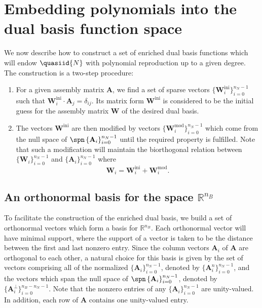 \section{Embedding polynomials into the dual basis function space}\label{sec:algorithm}

We now describe how to construct a set of enriched dual basis functions which will endow $\quasiid{N}$ with polynomial reproduction up to a given degree. The construction is a two-step procedure:
\begin{enumerate}
\item For a given assembly matrix $\mathbf{A}$, we find a set of sparse vectors $\{\mathbf{W}^\text{ini}_i\}_{i=0}^{n_N-1}$ such that $\mathbf{W}^\text{ini}_i\cdot\mathbf{A}_j=\delta_{ij}$. Its matrix form $\mathbf{W}^\text{ini}$ is considered to be the initial guess for the assembly matrix $\mathbf{W}$ of the desired dual basis.
  \item The vectors $\mathbf{W}^\text{ini}$ are then modified by vectors $\{\mathbf{W}^\text{mod}_i\}_{i=0}^{n_N-1}$ which come from the null space of $\spn\left\{\mathbf{A}_i\right\}_{i=0}^{n_N-1}$ until the required property is fulfilled. Note that such a modification will maintain the biorthogonal relation between $\{\mathbf{W}_i\}_{i=0}^{n_N-1}$ and $\{\mathbf{A}_i\}_{i=0}^{n_N-1}$ where
\begin{equation}
	\mathbf{W}_i=\mathbf{W}^\text{ini}_i+\mathbf{W}^\text{mod}_i.
\end{equation}
\end{enumerate}


\subsection{An orthonormal basis for the space $\mathbb{R}^{n_B}$}
To facilitate the construction of the enriched dual basis, we build a set of orthonormal vectors which form a basis for $\mathbb{R}^{n_B}$. Each orthonormal vector will have minimal support, where the support of a vector is taken to be the distance between the first and last nonzero entry. Since the column vectors $\mathbf{A}_i$ of $\mathbf{A}$ are orthogonal to each other, a natural choice for this basis is given by the set of vectors comprising all of the normalized $\{\mathbf{A}_i\}_{i=0}^{n_N-1}$, denoted by $\{\mathbf{A}^n_i\}_{i=0}^{n_N-1}$, and the vectors which span the null space of $\spn\left\{\mathbf{A}_i\right\}_{i=0}^{n_N-1}$, denoted by $\{\mathbf{A}^\perp_i\}_{i=0}^{n_B-n_N-1}$. Note that the nonzero entries of any $\{\mathbf{A}_i\}_{i=0}^{n_N-1}$ are unity-valued. In addition, each row of $\mathbf{A}$ contains one unity-valued entry.

